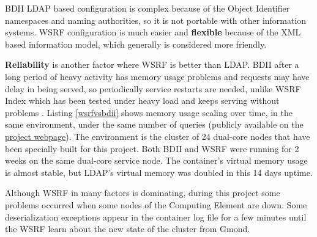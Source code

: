 BDII LDAP based configuration is complex because of the Object Identifier namespaces and naming authorities, so it is not portable with other information systems. WSRF configuration is much easier and {\bf flexible} because of the XML based information model, which generally is considered more friendly.

{\bf Reliability} is another factor where WSRF is better than LDAP. BDII after a long period of heavy activity has memory usage problems and requests may have delay in being served, so periodically service restarts are needed, unlike WSRF Index which has been tested under heavy load and keeps serving without problems \cite{schopf2006monitoring}. Listing \ref{wsrfvsbdii} shows memory usage scaling over time, in the same environment, under the same number of queries (publicly available on the \href{http://people.brunel.ac.uk/~dc09ttp/}{project webpage}). The environment is the cluster of 24 dual-core nodes that have been specially built for this project. Both BDII and WSRF were running for 2 weeks on the same dual-core service node. The container's virtual memory usage is almost stable, but LDAP's virtual memory was doubled in this 14 days uptime.

Although WSRF in many factors is dominating, during this project some problems occurred when some nodes of the Computing Element are down. Some deserialization exceptions appear in the container log file for a few minutes until the WSRF learn about the new state of the cluster from Gmond.
